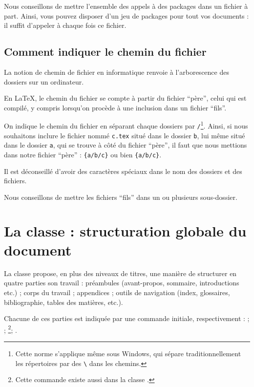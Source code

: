 Nous conseillons de mettre l'ensemble des appels à des packages dans un fichier à part. Ainsi, vous pouvez disposer d'un jeu de packages pour tout vos documents : il suffit d'appeler à chaque fois ce fichier.


\subsection{Comment indiquer le chemin du fichier}\label{chemin}

La notion de chemin de fichier en informatique renvoie à l'arborescence des dossiers sur un ordinateur.

En \LaTeX{}, le chemin du fichier se compte à partir du fichier \enquote{père}, celui qui est compilé, y compris lorsqu'on procède à une inclusion dans un fichier \enquote{fils}.

On indique le chemin du fichier en séparant chaque dossiers par \verb|/|\footnote{Cette norme s'applique même sous Windows, qui sépare traditionnellement les répertoires par des \texttt{\textbackslash} dans les chemins.}. Ainsi, si nous souhaitons inclure le fichier nommé \verb|c.tex| situé dans le dossier \verb|b|, lui même situé dans le dossier \verb|a|, qui se trouve à côté du fichier \enquote{père}, il faut que nous mettions dans notre fichier \enquote{père} : \verb|{a/b/c}|
ou bien
\verb|{a/b/c}|.

\begin{attention}

Il est déconseillé d'avoir des caractères spéciaux dans le nom des dossiers et des fichiers.
\end{attention}

Nous conseillons de mettre les fichiers \enquote{fils} dans un ou plusieurs sous-dossier.

\section{La classe  : structuration globale du document}\label{sectionbook}

La classe  propose, en plus des niveaux de titres, une manière de structurer en quatre parties son travail : préambules (avant-propos, sommaire, introductions etc.) ; corps du travail ; appendices ; outils de navigation (index, glossaires, bibliographie, tables des matières,  etc.). 

Chacune de ces parties est indiquée par une commande initiale, respectivement :  ;  ; \footnote{Cette commande existe aussi dans la classe .}; .

